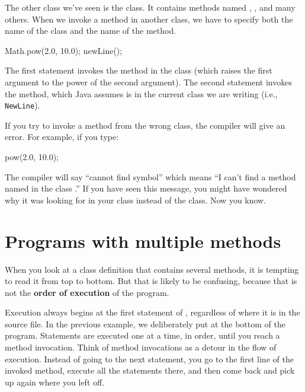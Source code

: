 The other class we've seen is the  class.
It contains methods named , , and many others.
When we invoke a method in another class, we have to specify both the name of the class and the name of the method.

\begin{code}
    Math.pow(2.0, 10.0);
    newLine();
\end{code}

The first statement invokes the  method in the  class (which raises the first argument to the power of the second argument).
The second statement invokes the  method, which Java assumes is in the current class we are writing (i.e., {\tt NewLine}).

If you try to invoke a method from the wrong class, the compiler will give an error.
For example, if you type:

\begin{code}
    pow(2.0, 10.0);
\end{code}

The compiler will say ``cannot find symbol'' which means ``I can't find a method named  in the class .''
If you have seen this message, you might have wondered why it was looking for  in your class instead of the  class.
Now you know.


\section{Programs with multiple methods}


When you look at a class definition that contains several methods, it is tempting to read it from top to bottom.
But that is likely to be confusing, because that is not the {\bf order of execution} of the program.

Execution always begins at the first statement of , regardless of where it is in the source file.
In the previous example, we deliberately put  at the bottom of the program.
Statements are executed one at a time, in order, until you reach a method invocation.
Think of method invocations as a detour in the flow of execution.
Instead of going to the next statement, you go to the first line of the invoked method, execute all the statements there, and then come back and pick up again where you left off.

